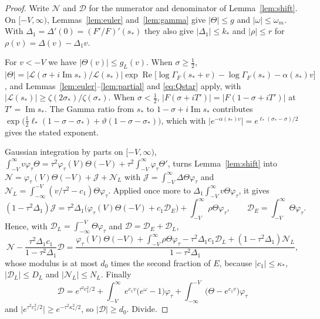 \documentclass[11pt]{article}
\theoremstyle{definition}
\theoremstyle{remark}
\newcommand{\cL}{\mathcal L}
\newcommand{\re}{\operatorname{Re}}
\newcommand{\im}{\operatorname{Im}}
\numberwithin{equation}{section}
\begin{document}
\begin{proof}
Write $\mathcal N$ and $\mathcal D$ for the numerator and denominator of
Lemma~\ref{lem:shift}. On $[-V,\infty)$, Lemmas~\ref{lem:euler}
and~\ref{lem:gamma} give $\lvert\Theta\rvert\le g$ and
$\lvert\omega\rvert\le\omega_m$. With $\Delta_1=\Delta'(0)=(F'/F)'(s_*)$
they also give $\lvert\Delta_1\rvert\le k_*$ and $\lvert\rho\rvert\le r$ for
$\rho(v)=\Delta(v)-\Delta_1v$.

For $v<-V$ we have $\lvert\Theta(v)\rvert\le g_L(v)$. When
$\sigma\ge\frac12$,
$\lvert\Theta\rvert=\lvert\cL(\sigma+i\im s_*)/\cL(s_*)\rvert\exp\re\bigl[\log\Gamma_F(s_*+v)-\log\Gamma_F(s_*)-\alpha(s_*)v\bigr]$,
and Lemmas~\ref{lem:euler}--\ref{lem:partial} and \eqref{eq:Qstar} apply,
with $\lvert\cL(s_*)\rvert\ge\zeta(2\sigma_*)/\zeta(\sigma_*)$. When
$\sigma<\frac12$, $\lvert F(\sigma+iT')\rvert=\lvert F(1-\sigma+iT')\rvert$
at $T'=\im s_*$. The Gamma ratio from $s_*$ to $1-\sigma+i\im s_*$
contributes $\exp\bigl(\frac12\ell_*(1-\sigma-\sigma_*)+\vartheta(1-\sigma-\sigma_*)\bigr)$,
which with $\lvert e^{-\alpha(s_*)v}\rvert=e^{\ell_*(\sigma_*-\sigma)/2}$
gives the stated exponent.

Gaussian integration by parts on $[-V,\infty)$,
$\int_{-V}^\infty v\varphi_\tau\Theta=\tau^2\varphi_\tau(V)\Theta(-V)+\tau^2\int_{-V}^\infty\varphi_\tau\Theta'$,
turns Lemma~\ref{lem:shift} into
$\mathcal N=\varphi_\tau(V)\Theta(-V)+\mathcal J+\mathcal N_L$ with
$\mathcal J=\int_{-V}^\infty\Delta\Theta\varphi_\tau$ and
$\mathcal N_L=\int_{-\infty}^{-V}(v/\tau^2-c_1)\Theta\varphi_\tau$. Applied
once more to $\Delta_1\int_{-V}^\infty v\Theta\varphi_\tau$, it gives
\[
(1-\tau^2\Delta_1)\mathcal J=\tau^2\Delta_1\bigl(\varphi_\tau(V)\Theta(-V)+c_1\mathcal D_E\bigr)+\int_{-V}^\infty\rho\Theta\varphi_\tau,\qquad
\mathcal D_E=\int_{-V}^\infty\Theta\varphi_\tau .
\]
Hence, with $\mathcal D_L=\int_{-\infty}^{-V}\Theta\varphi_\tau$ and
$\mathcal D=\mathcal D_E+\mathcal D_L$,
\[
\mathcal N-\frac{\tau^2\Delta_1c_1}{1-\tau^2\Delta_1}\mathcal D=
\frac{\varphi_\tau(V)\Theta(-V)+\int_{-V}^\infty\rho\Theta\varphi_\tau-\tau^2\Delta_1c_1\mathcal D_L+(1-\tau^2\Delta_1)\mathcal N_L}{1-\tau^2\Delta_1},
\]
whose modulus is at most $d_0$ times the second fraction of $E$, because
$\lvert c_1\rvert\le\kappa_*$, $\lvert\mathcal D_L\rvert\le D_L$ and
$\lvert\mathcal N_L\rvert\le N_L$. Finally
\[
\mathcal D=e^{\tau^2c_1^2/2}+\int_{-V}^\infty e^{c_1v}\bigl(e^{\omega}-1\bigr)\varphi_\tau+\int_{-\infty}^{-V}\bigl(\Theta-e^{c_1v}\bigr)\varphi_\tau
\]
and $\lvert e^{\tau^2c_1^2/2}\rvert\ge e^{-\tau^2\kappa_*^2/2}$, so
$\lvert\mathcal D\rvert\ge d_0$. Divide.
\end{proof}
\end{document}
